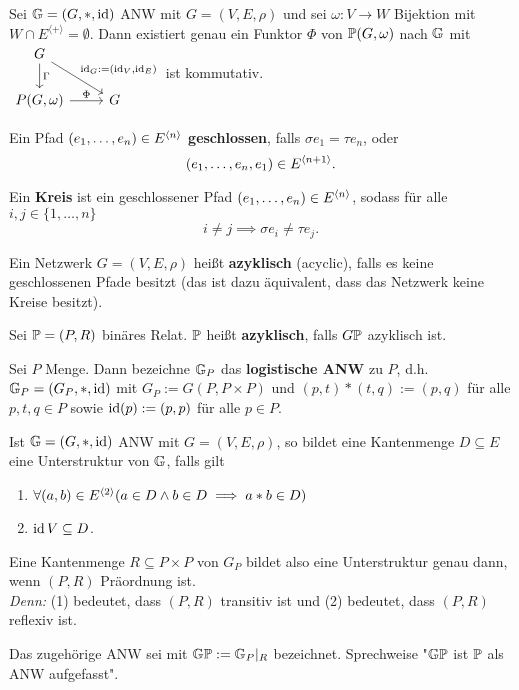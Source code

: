 \begin{bemerkung}
    Sei $\G = (G, \ast, \id)$ ANW mit $G=(V,E,\rho)$ und sei $\omega: V \to W$ Bijektion mit $W \cap E^{\langle + \rangle} = \emptyset$.
    Dann existiert genau ein Funktor $\Phi$ von $\P(G, \omega)$ nach $\G$ mit
    $\begin{tikzcd}
        G \dar{\Gamma} \drar{\id_G:=(\id_V, \id_E)}\\
        P(G,\omega) \rar{\Phi} & G
    \end{tikzcd}$ ist kommutativ.
\end{bemerkung}

\begin{definition}
    Ein Pfad $(e_1,\ldots,e_n) \in E^{\<n\>}$ \textbf{geschlossen}, falls $\sigma e_1 = \tau e_n$, oder
    $$ (e_1,\ldots,e_n, e_1) \in E^{\<n+1\>}.$$
\end{definition}

\begin{definition}
    Ein \textbf{Kreis} ist ein geschlossener Pfad $(e_1,\ldots,e_n) \in E^{\<n\>}$, sodass für alle $i,j \in \{1,\ldots,n\}$ 
    $$ i \neq j \implies \sigma e_i \ne \tau e_j .$$
\end{definition}

\begin{definition}
    Ein Netzwerk $G=(V,E,\rho)$ heißt \textbf{azyklisch} (acyclic), falls es keine geschlossenen Pfade besitzt (das ist dazu
    äquivalent, dass das Netzwerk keine Kreise besitzt).
\end{definition}

\begin{definition}
    Sei $\P = (P,R)$ binäres Relat. $\P$ heißt \textbf{azyklisch}, falls $G\P$ azyklisch ist.
\end{definition}

\begin{erinnerungnr}
    Sei $P$ Menge. Dann bezeichne $\G_P$ das \textbf{logistische ANW} zu $P$, d.h. $\G_P=(G_P, \ast, \id)$
    mit $G_P := G(P, P \times P)$ und $(p,t)\ast(t,q) := (p,q)$ für alle $p,t,q \in P$ sowie 
    $\id(p) := (p,p)$ für alle $p \in P$.

    Ist $\G=(G,\ast, \id)$ ANW mit $G=(V,E,\rho)$, so bildet eine Kantenmenge $D \subseteq E$ eine Unterstruktur
    von $\G$, falls gilt
    \begin{enumerate}[label=(\arabic*)]
        \item $\forall (a,b) \in E^{\<2\>}(a\in D \land b \in D \implies a \ast b \in D)$
        \item $\id V \subseteq D$.
    \end{enumerate}

    Eine Kantenmenge $R \subseteq P \times P$ von $G_P$ bildet also eine Unterstruktur genau dann, wenn
    $(P,R)$ Präordnung ist.\\
    \textit{Denn:} (1) bedeutet, dass $(P,R)$ transitiv ist und (2) bedeutet, dass $(P,R)$ reflexiv ist.

    Das zugehörige ANW sei mit $\G\P := \G_P|_R$ bezeichnet. Sprechweise "$\G\P$ ist $\P$ als ANW aufgefasst".
\end{erinnerungnr}

